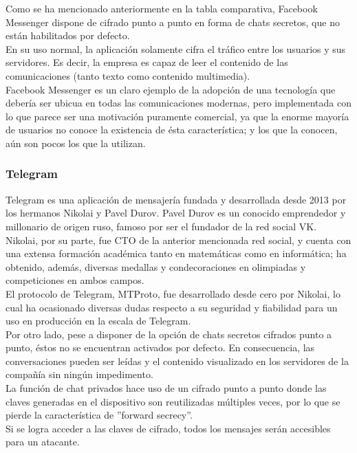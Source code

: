 Como se ha mencionado anteriormente en la tabla comparativa, Facebook Messenger dispone de cifrado punto a punto en forma de chats secretos, que no están habilitados por defecto. \\
En su uso normal, la aplicación solamente cifra el tráfico entre los usuarios y sus servidores. Es decir, la empresa es capaz de leer el contenido de las comunicaciones (tanto texto como contenido multimedia). \\

Facebook Messenger es un claro ejemplo de la adopción de una tecnología que debería ser ubicua en todas las comunicaciones modernas, pero implementada con lo que parece ser una motivación puramente comercial, ya que la enorme mayoría de usuarios no conoce la existencia de ésta característica; y los que la conocen, aún son pocos los que la utilizan. \\

\subsubsection {Telegram}

Telegram es una aplicación de mensajería fundada y desarrollada desde 2013 por los hermanos Nikolai y Pavel Durov. Pavel Durov es un conocido emprendedor y millonario de origen ruso, famoso por ser el fundador de la red social VK. \\ 

Nikolai, por su parte, fue CTO de la anterior mencionada red social, y cuenta con una extensa formación académica tanto en matemáticas como en informática; ha obtenido, además, diversas medallas y condecoraciones en olimpiadas y competiciones en ambos campos. \\

El protocolo de Telegram, MTProto, fue desarrollado desde cero por Nikolai, lo cual ha ocasionado diversas dudas respecto a su seguridad y fiabilidad para un uso en producción en la escala de Telegram. \\

Por otro lado, pese a disponer de la opción de chats secretos cifrados punto a punto, éstos no se encuentran activados por defecto. En consecuencia, las conversaciones pueden ser leídas y el contenido visualizado en los servidores de la compañía sin ningún impedimento. \\

La función de chat privados hace uso de un cifrado punto a punto donde las claves generadas en el dispositivo son reutilizadas múltiples veces, por lo que se pierde la característica de ''forward secrecy''. \\ Si se logra acceder a las claves de cifrado, todos los mensajes serán accesibles para un atacante. \\

